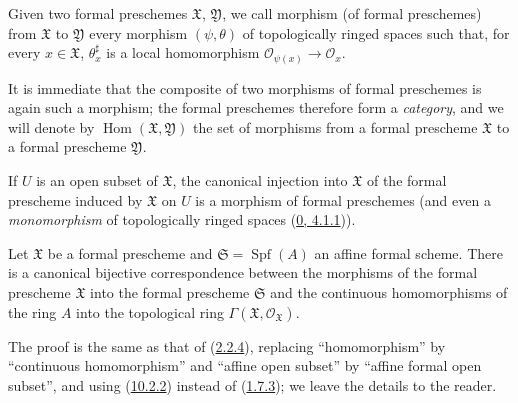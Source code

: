 \begin{definition}[10.4.5]
\label{I.10.4.5}
Given two formal preschemes $\mathfrak{X}$, $\mathfrak{Y}$, we call
morphism (of formal preschemes) from $\mathfrak{X}$ to
$\mathfrak{Y}$ every morphism $(\psi,\theta)$ of topologically ringed
spaces such that, for every $x\in\mathfrak{X}$, $\theta_x^\sharp$ is a
local homomorphism
$\mathscr{O}_{\psi(x)}\to\mathscr{O}_x$.
\end{definition}

It is immediate that the composite of two morphisms of formal preschemes is
again such a morphism; the formal preschemes therefore form a
\emph{category}, and we will denote by
$\operatorname{Hom}(\mathfrak{X},\mathfrak{Y})$ the set of morphisms
from a formal prescheme $\mathfrak{X}$ to a formal prescheme
$\mathfrak{Y}$.

If $U$ is an open subset of $\mathfrak{X}$, the canonical injection
into $\mathfrak{X}$ of the formal prescheme induced by $\mathfrak{X}$ on $U$
is a morphism of formal preschemes (and even a
\emph{monomorphism} of topologically ringed spaces
(\hyperref[0.4.1.1]{0, 4.1.1})).

\begin{proposition}[10.4.6]
\label{I.10.4.6}
Let $\mathfrak{X}$ be a formal prescheme and
$\mathfrak{S}=\operatorname{Spf}(A)$ an affine formal scheme. There is
a canonical bijective correspondence between the morphisms of the formal
prescheme $\mathfrak{X}$ into the formal prescheme $\mathfrak{S}$ and the
continuous homomorphisms of the ring $A$ into the topological ring
$\Gamma(\mathfrak{X},\mathscr{O}_{\mathfrak{X}})$.
\end{proposition}

The proof is the same as that of
(\hyperref[I.2.2.4]{2.2.4}), replacing ``homomorphism'' by
``continuous homomorphism'' and ``affine open subset'' by ``affine formal
open subset'', and using (\hyperref[I.10.2.2]{10.2.2}) instead of
(\hyperref[I.1.7.3]{1.7.3}); we leave the details to the reader.

